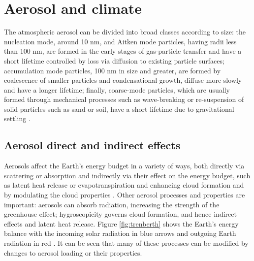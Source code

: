 \section{Aerosol and climate} %


The atmospheric aerosol can be divided into broad classes according to size: the nucleation mode, around 10 nm, and Aitken mode particles, having radii less than 100 nm, are formed in the early stages of gas-particle transfer and have a short lifetime controlled by loss via diffusion to existing particle surfaces; accumulation mode particles, 100 nm in size and greater, are formed by coalescence of smaller particles and condensational growth, diffuse more slowly and have a longer lifetime; finally, coarse-mode particles, which are usually formed through mechanical processes such as wave-breaking or re-suspension of solid particles such as sand or soil, have a short lifetime due to gravitational settling \citep{seinfeldAtmosphericChemistryPhysics2016}.





\subsection{Aerosol direct and indirect effects}


Aerosols affect the Earth’s energy budget in a variety of ways, both directly via scattering or absorption and indirectly via their effect on the energy budget, such as latent heat release or evapotranspiration and enhancing cloud formation and by modulating the cloud properties \citep{angstromAtmosphericTransmissionSun1929, readGlobalEnergyBudgets2016}.  Other aerosol processes and properties are important: aerosols can absorb radiation, increasing the strength of the greenhouse effect; hygroscopicity governs cloud formation, and hence indirect effects and latent heat release. Figure \ref{fig:trenberth} shows the Earth's energy balance with the incoming solar radiation in blue arrows and outgoing Earth radiation in red \citep{kiehlEarthAnnualGlobal1997}.  It can be seen that many of these processes can be modified by changes to aerosol loading or their properties. 

